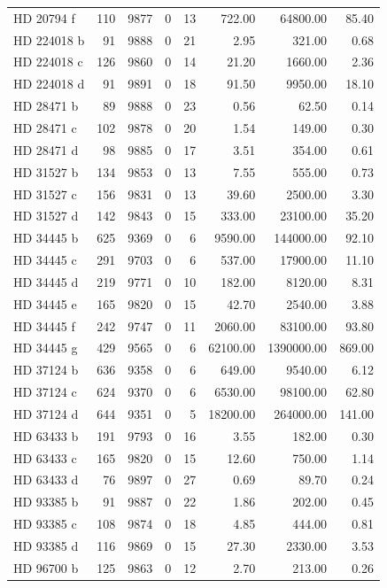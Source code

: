 \begin{table}
\begin{tabular}{lrrrrrrr}
HD 20794 f & 110 & 9877 & 0 & 13 & 722.00 & 64800.00 & 85.40 \\
HD 224018 b & 91 & 9888 & 0 & 21 & 2.95 & 321.00 & 0.68 \\
HD 224018 c & 126 & 9860 & 0 & 14 & 21.20 & 1660.00 & 2.36 \\
HD 224018 d & 91 & 9891 & 0 & 18 & 91.50 & 9950.00 & 18.10 \\
HD 28471 b & 89 & 9888 & 0 & 23 & 0.56 & 62.50 & 0.14 \\
HD 28471 c & 102 & 9878 & 0 & 20 & 1.54 & 149.00 & 0.30 \\
HD 28471 d & 98 & 9885 & 0 & 17 & 3.51 & 354.00 & 0.61 \\
HD 31527 b & 134 & 9853 & 0 & 13 & 7.55 & 555.00 & 0.73 \\
HD 31527 c & 156 & 9831 & 0 & 13 & 39.60 & 2500.00 & 3.30 \\
HD 31527 d & 142 & 9843 & 0 & 15 & 333.00 & 23100.00 & 35.20 \\
HD 34445 b & 625 & 9369 & 0 & 6 & 9590.00 & 144000.00 & 92.10 \\
HD 34445 c & 291 & 9703 & 0 & 6 & 537.00 & 17900.00 & 11.10 \\
HD 34445 d & 219 & 9771 & 0 & 10 & 182.00 & 8120.00 & 8.31 \\
HD 34445 e & 165 & 9820 & 0 & 15 & 42.70 & 2540.00 & 3.88 \\
HD 34445 f & 242 & 9747 & 0 & 11 & 2060.00 & 83100.00 & 93.80 \\
HD 34445 g & 429 & 9565 & 0 & 6 & 62100.00 & 1390000.00 & 869.00 \\
HD 37124 b & 636 & 9358 & 0 & 6 & 649.00 & 9540.00 & 6.12 \\
HD 37124 c & 624 & 9370 & 0 & 6 & 6530.00 & 98100.00 & 62.80 \\
HD 37124 d & 644 & 9351 & 0 & 5 & 18200.00 & 264000.00 & 141.00 \\
HD 63433 b & 191 & 9793 & 0 & 16 & 3.55 & 182.00 & 0.30 \\
HD 63433 c & 165 & 9820 & 0 & 15 & 12.60 & 750.00 & 1.14 \\
HD 63433 d & 76 & 9897 & 0 & 27 & 0.69 & 89.70 & 0.24 \\
HD 93385 b & 91 & 9887 & 0 & 22 & 1.86 & 202.00 & 0.45 \\
HD 93385 c & 108 & 9874 & 0 & 18 & 4.85 & 444.00 & 0.81 \\
HD 93385 d & 116 & 9869 & 0 & 15 & 27.30 & 2330.00 & 3.53 \\
HD 96700 b & 125 & 9863 & 0 & 12 & 2.70 & 213.00 & 0.26 \\

\end{tabular}
\end{table}
